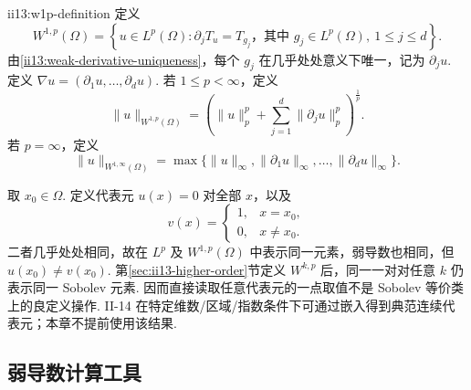 \begin{FADefinition}{ii13:w1p-definition}
定义
\[
W^{1,p}(\Omega)
=
\left\{u\in L^p(\Omega):
\partial_jT_u=T_{g_j}\text{，其中 }g_j\in L^p(\Omega),\ 1\leqslant j\leqslant d
\right\}.
\]
由\autoref{ii13:weak-derivative-uniqueness}，每个 \(\displaystyle g_j\) 在几乎处处意义下唯一，记为 \(\displaystyle\partial_ju\). 定义 \(\displaystyle \nabla u = (\partial_1u,\dots,\partial_du).\)
若 \(\displaystyle1\leqslant p<\infty\)，定义
\[
\|u\|_{W^{1,p}(\Omega)}
=
\left(
\|u\|_p^p+
\sum_{j=1}^d\|\partial_ju\|_p^p
\right)^{\frac{1}{p}}.
\]
若 \(\displaystyle p=\infty\)，定义
\[
\|u\|_{W^{1,\infty}(\Omega)}
=
\max\{\|u\|_\infty,\|\partial_1u\|_\infty,\dots,\|\partial_du\|_\infty\}.
\]
\end{FADefinition}

\begin{FACounterexample}
取 \(\displaystyle x_0\in\Omega\). 定义代表元 \(\displaystyle u(x)=0\) 对全部 \(\displaystyle x\)，以及
\[
v(x)
=
\begin{cases}
1,&x=x_0,\\
0,&x\neq x_0.
\end{cases}
\]
二者几乎处处相同，故在 \(\displaystyle L^p\) 及 \(\displaystyle W^{1,p}(\Omega)\) 中表示同一元素，弱导数也相同，但 \(\displaystyle u(x_0)\neq v(x_0)\). 第\ref{sec:ii13-higher-order}节定义 \(\displaystyle W^{k,p}\) 后，同一一对对任意 \(\displaystyle k\) 仍表示同一 Sobolev 元素. 因而直接读取任意代表元的一点取值不是 Sobolev 等价类上的良定义操作. II-14 在特定维数/区域/指数条件下可通过嵌入得到典范连续代表元；本章不提前使用该结果.
\end{FACounterexample}

\subsection{弱导数计算工具}

